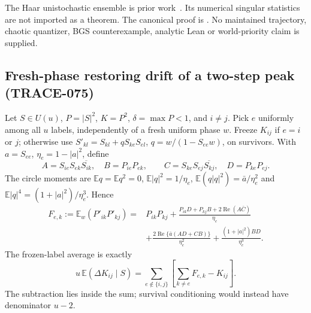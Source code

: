 The Haar unistochastic ensemble is prior work~\cite{ZKSS2003Unitary}.
Its numerical singular statistics are not imported as a theorem.
The canonical proof is
.
No maintained trajectory, chaotic quantizer, BGS counterexample,
analytic Lean or world-priority claim is supplied.

\subsection{Fresh-phase restoring drift of a two-step peak (TRACE-075)}
Let $S\in U(u)$, $P=|S|^2$, $K=P^2$, $\delta=\max P<1$, and $i\ne j$.
Pick $e$ uniformly among all $u$ labels, independently of a fresh uniform
phase $w$. Freeze $K_{ij}$ if $e=i$ or $j$; otherwise use
$S'_{kl}=S_{kl}+qS_{ke}S_{el}$, $q=w/(1-S_{ee}w)$, on survivors.
With $a=S_{ee}$, $\eta_e=1-|a|^2$, define
\[
 A=S_{ie}S_{ek}\overline{S_{ik}},\quad B=P_{ie}P_{ek},\qquad
 C=S_{ke}S_{ej}\overline{S_{kj}},\quad D=P_{ke}P_{ej}.
\]
The circle moments are
$\mathbb Eq=\mathbb Eq^2=0$,
$\mathbb E|q|^2=1/\eta_e$,
$\mathbb E(q|q|^2)=\bar a/\eta_e^2$ and
$\mathbb E|q|^4=(1+|a|^2)/\eta_e^3$. Hence
\[
 \begin{split}
 F_{e,k}:=\mathbb E_w(P'_{ik}P'_{kj})
 ={}&P_{ik}P_{kj}
 +\frac{P_{ik}D+P_{kj}B+2\operatorname{Re}(A\bar C)}{\eta_e}\\
 &+\frac{2\operatorname{Re}\{\bar a(AD+CB)\}}{\eta_e^2}
 +\frac{(1+|a|^2)BD}{\eta_e^3}.
 \end{split}
\]
The frozen-label average is exactly
\[
 u\,\mathbb E(\Delta K_{ij}\mid S)
 =\sum_{e\notin\{i,j\}}\left[\sum_{k\ne e}F_{e,k}-K_{ij}\right].
\]
The subtraction lies inside the sum; survival conditioning would instead
have denominator $u-2$.

